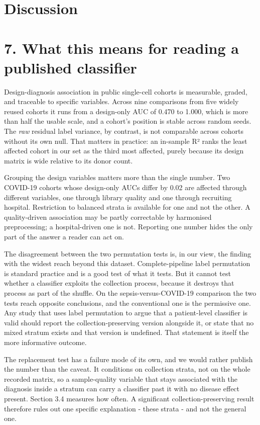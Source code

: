 \section{Discussion}\label{discussion}

\section{7. What this means for reading a published classifier}\label{what-this-means-for-reading-a-published-classifier}

Design-diagnosis association in public single-cell cohorts is measurable, graded, and traceable to specific variables. Across nine comparisons from five widely reused cohorts it runs from a design-only AUC of 0.470 to 1.000, which is more than half the usable scale, and a cohort's position is stable across random seeds. The \emph{raw} residual label variance, by contrast, is not comparable across cohorts without its own null. That matters in practice: an in-sample R² ranks the least affected cohort in our set as the third most affected, purely because its design matrix is wide relative to its donor count.

Grouping the design variables matters more than the single number. Two COVID-19 cohorts whose design-only AUCs differ by 0.02 are affected through different variables, one through library quality and one through recruiting hospital. Restriction to balanced strata is available for one and not the other. A quality-driven association may be partly correctable by harmonised preprocessing; a hospital-driven one is not. Reporting one number hides the only part of the answer a reader can act on.

The disagreement between the two permutation tests is, in our view, the finding with the widest reach beyond this dataset. Complete-pipeline label permutation is standard practice and is a good test of what it tests. But it cannot test whether a classifier exploits the collection process, because it destroys that process as part of the shuffle. On the sepsis-versus-COVID-19 comparison the two tests reach opposite conclusions, and the conventional one is the permissive one. Any study that uses label permutation to argue that a patient-level classifier is valid should report the collection-preserving version alongside it, or state that no mixed stratum exists and that version is undefined. That statement is itself the more informative outcome.

The replacement test has a failure mode of its own, and we would rather publish the number than the caveat. It conditions on collection strata, not on the whole recorded matrix, so a sample-quality variable that stays associated with the diagnosis inside a stratum can carry a classifier past it with no disease effect present. Section 3.4 measures how often. A significant collection-preserving result therefore rules out one specific explanation - these strata - and not the general one.

